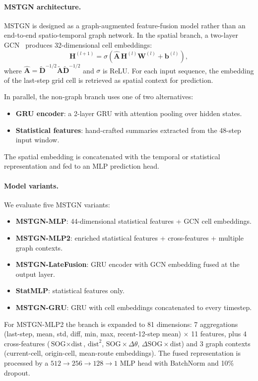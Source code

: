 \documentclass[sigconf,anonymous]{acmart}%
\begin{document}
\paragraph{MSTGN architecture.}
MSTGN is designed as a graph-augmented feature-fusion model rather than an end-to-end spatio-temporal graph network. In the spatial branch, a two-layer GCN~\cite{kipf2017gcn} produces 32-dimensional cell embeddings:
\begin{equation}
    \mathbf{H}^{(l+1)} = \sigma\!\left(\hat{\mathbf{A}} \, \mathbf{H}^{(l)} \mathbf{W}^{(l)} + \mathbf{b}^{(l)}\right),
\end{equation}
where $\hat{\mathbf{A}} = \tilde{\mathbf{D}}^{-1/2}\tilde{\mathbf{A}}\tilde{\mathbf{D}}^{-1/2}$ and $\sigma$ is ReLU. For each input sequence, the embedding of the last-step grid cell is retrieved as spatial context for prediction.

In parallel, the non-graph branch uses one of two alternatives:
\begin{itemize}
    \item \textbf{GRU encoder}: a 2-layer GRU with attention pooling over hidden states.
    \item \textbf{Statistical features}: hand-crafted summaries extracted from the 48-step input window.
\end{itemize}
The spatial embedding is concatenated with the temporal or statistical representation and fed to an MLP prediction head.

\paragraph{Model variants.}
We evaluate five MSTGN variants:
\begin{itemize}
    \item \textbf{MSTGN-MLP}: 44-dimensional statistical features + GCN cell embeddings.
    \item \textbf{MSTGN-MLP2}: enriched statistical features + cross-features + multiple graph contexts.
    \item \textbf{MSTGN-LateFusion}: GRU encoder with GCN embedding fused at the output layer.
    \item \textbf{StatMLP}: statistical features only.
    \item \textbf{MSTGN-GRU}: GRU with cell embeddings concatenated to every timestep.
\end{itemize}

For MSTGN-MLP2 the branch is expanded to 81 dimensions: 7 aggregations (last-step, mean, std, diff, min, max, recent-12-step mean) $\times$ 11 features, plus 4 cross-features ($\text{SOG}{\times}\text{dist}$, $\text{dist}^2$, $\text{SOG}{\times}\Delta\theta$, $\Delta\text{SOG}{\times}\text{dist}$) and 3 graph contexts (current-cell, origin-cell, mean-route embeddings). The fused representation is processed by a $512 \to 256 \to 128 \to 1$ MLP head with BatchNorm and 10\% dropout.
\end{document}
